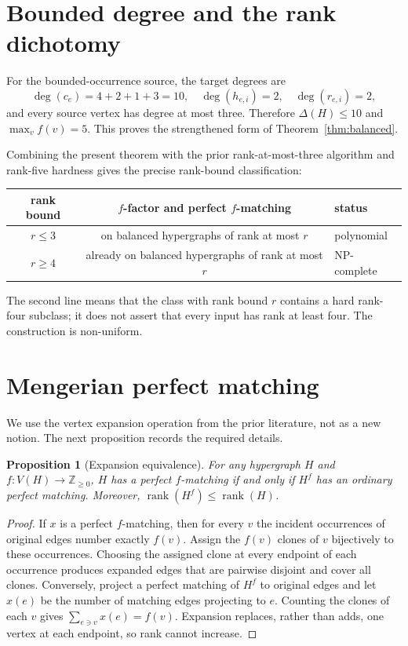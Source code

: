 \documentclass[11pt]{article}
\newtheorem{proposition}[theorem]{Proposition}
\theoremstyle{definition}
\theoremstyle{remark}
\newcommand{\Z}{\mathbb Z}
\begin{document}
\section{Bounded degree and the rank dichotomy}

For the bounded-occurrence source, the target degrees are
\[
\deg(c_e)=4+2+1+3=10,
\quad \deg(h_{e,i})=2,
\quad \deg(r_{e,i})=2,
\]
and every source vertex has degree at most three. Therefore
$\Delta(H)\le10$ and $\max_v f(v)=5$. This proves the strengthened form of
Theorem~\ref{thm:balanced}.

Combining the present theorem with the prior rank-at-most-three algorithm
and rank-five hardness gives the precise rank-bound classification:
\begin{center}
\begin{tabular}{ccl}
\toprule
rank bound & $f$-factor and perfect $f$-matching & status\\
\midrule
$r\le3$ & on balanced hypergraphs of rank at most $r$ & polynomial\\
$r\ge4$ & already on balanced hypergraphs of rank at most $r$ & NP-complete\\
\bottomrule
\end{tabular}
\end{center}
The second line means that the class with rank bound $r$ contains a hard
rank-four subclass; it does not assert that every input has rank at least
four. The construction is non-uniform.

\section{Mengerian perfect matching}

We use the vertex expansion operation from the prior literature, not as a
new notion. The next proposition records the required details.

\begin{proposition}[Expansion equivalence]
For any hypergraph $H$ and $f:V(H)\to\Z_{\ge0}$, $H$ has a perfect
$f$-matching if and only if $H^f$ has an ordinary perfect matching. Moreover,
$\operatorname{rank}(H^f)\le\operatorname{rank}(H)$.
\end{proposition}

\begin{proof}
If $x$ is a perfect $f$-matching, then for every $v$ the incident
occurrences of original edges number exactly $f(v)$. Assign the $f(v)$
clones of $v$ bijectively to these occurrences. Choosing the assigned clone
at every endpoint of each occurrence produces expanded edges that are
pairwise disjoint and cover all clones. Conversely, project a perfect
matching of $H^f$ to original edges and let $x(e)$ be the number of matching
edges projecting to $e$. Counting the clones of each $v$ gives
$\sum_{e\ni v}x(e)=f(v)$. Expansion replaces, rather than adds, one vertex
at each endpoint, so rank cannot increase.
\end{proof}
\end{document}
